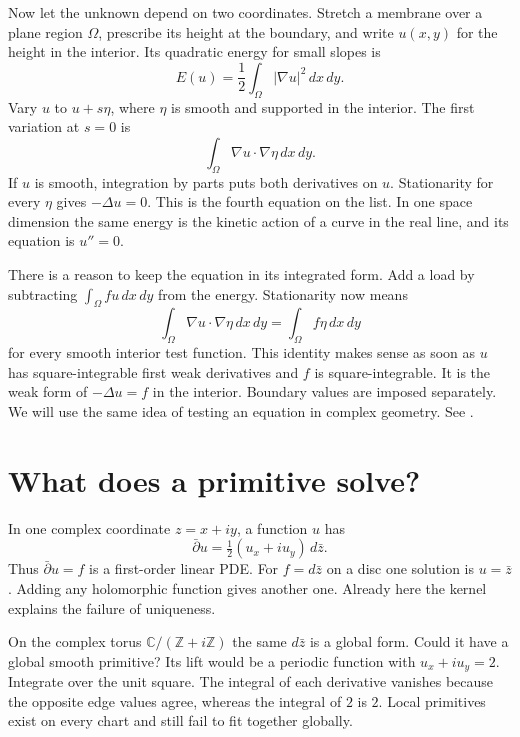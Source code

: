 Now let the unknown depend on two
coordinates. Stretch a membrane over a
plane region $\Omega$, prescribe its height
at the boundary, and write $u(x,y)$ for
the height in the interior. Its quadratic
energy for small slopes is
$$
E(u)=\frac12\int_\Omega|\nabla u|^2\,dx\,dy.
$$
Vary $u$ to $u+s\eta$, where $\eta$ is
smooth and supported in the interior.
The first variation at $s=0$ is
$$
\int_\Omega\nabla u\cdot\nabla\eta\,dx\,dy.
$$
If $u$ is smooth, integration by parts
puts both derivatives on $u$. Stationarity
for every $\eta$ gives $-\Delta u=0$.
This is the fourth equation on the list.
In one space dimension the same energy is
the kinetic action of a curve in the real
line, and its equation is $u''=0$.

There is a reason to keep the equation in
its integrated form. Add a load by
subtracting $\int_\Omega fu\,dx\,dy$ from
the energy. Stationarity now means
$$
\int_\Omega\nabla u\cdot\nabla\eta\,dx\,dy
=\int_\Omega f\eta\,dx\,dy
$$
for every smooth interior test function.
This identity makes sense as soon as $u$
has square-integrable first weak
derivatives and $f$ is square-integrable.
It is the weak form of $-\Delta u=f$ in
the interior. Boundary values are imposed
separately. We will use the same idea of
testing an equation in complex geometry.
See \cite[Chapter 8]{salsa-verzini}.

\section{What does a primitive solve?}
\label{section-dbar-primitive}

In one complex coordinate $z=x+iy$, a
function $u$ has
$$
\bar\partial u=
\tfrac12(u_x+i u_y)\,d\bar z.
$$
Thus $\bar\partial u=f$ is a first-order
linear PDE. For $f=d\bar z$ on a disc
one solution is $u=\bar z$. Adding any
holomorphic function gives another one.
Already here the kernel explains the
failure of uniqueness.

On the complex torus
$\mathbb{C}/(\mathbb{Z}+i\mathbb{Z})$ the
same $d\bar z$ is a global form. Could
it have a global smooth primitive? Its
lift would be a periodic function with
$u_x+i u_y=2$. Integrate over the unit
square. The integral of each derivative
vanishes because the opposite edge values
agree, whereas the integral of $2$ is $2$.
Local primitives exist on every chart and
still fail to fit together globally.

